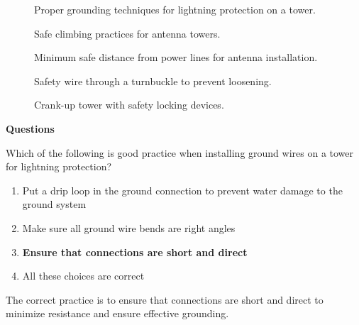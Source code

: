 \begin{figure}[h]
\centering
\caption{Proper grounding techniques for lightning protection on a tower.}
\label{fig:grounding-techniques}
\end{figure}

\begin{figure}[h]
\centering
\caption{Safe climbing practices for antenna towers.}
\label{fig:climbing-safety}
\end{figure}

\begin{figure}[h]
\centering
\caption{Minimum safe distance from power lines for antenna installation.}
\label{fig:power-line-distance}
\end{figure}

\begin{figure}[h]
\centering
\caption{Safety wire through a turnbuckle to prevent loosening.}
\label{fig:turnbuckle-safety}
\end{figure}

\begin{figure}[h]
\centering
\caption{Crank-up tower with safety locking devices.}
\label{fig:crank-up-tower}
\end{figure}

\textbf{Questions}

\begin{tcolorbox}[colback=gray!10!white,colframe=black!75!black,title={T0B01}]
Which of the following is good practice when installing ground wires on a tower for lightning protection?
\begin{enumerate}[label=\Alph*),noitemsep]
    \item Put a drip loop in the ground connection to prevent water damage to the ground system
    \item Make sure all ground wire bends are right angles
    \item \textbf{Ensure that connections are short and direct}
    \item All these choices are correct
\end{enumerate}
\end{tcolorbox}
The correct practice is to ensure that connections are short and direct to minimize resistance and ensure effective grounding.

